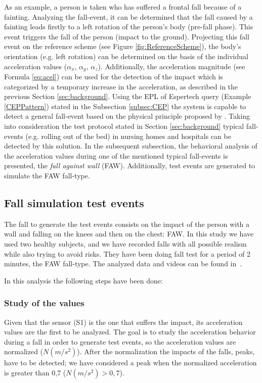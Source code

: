 \documentclass[review]{elsarticle}
\begin{document}
As an example, a person is taken who has suffered a frontal fall because of a fainting. Analyzing the fall-event, it can be determined that the fall caused by a fainting leads firstly to a left rotation of the person's body (pre-fall phase). This event triggers the fall of the person (impact to the ground). Projecting this fall event on the reference scheme (see Figure \ref{fig:ReferenceScheme}), the body's orientation (e.g. left rotation) can be determined on the basis of the individual acceleration values ($\alpha_x$,  $\alpha_y$,  $\alpha_z$). Additionally, the acceleration magnitude (see Formula \ref{eq:acel}) can be used for the detection of the impact which is categorized by a temporary increase in the acceleration, as described in the previous Section \ref{sec:background}. Using the EPL of Espertech query (Example \ref{CEPPattern}) stated in the Subsection \ref{subsec:CEP} the system is capable to detect a general fall-event based on the physical principle proposed by \cite{Kozina}.
Taking into consideration the test protocol stated in Section \ref{sec:background} typical fall-events (e.g. rolling out of the bed) in nursing homes and hospitals can be detected by this solution. In the subsequent subsection, the behavioral analysis of the acceleration values during one of the mentioned typical fall-events is presented, the \textit{fall against wall} (FAW). Additionally, test events are generated to simulate the FAW fall-type.

\subsection{Fall simulation test events}

The fall to generate the test events consists on the impact of the person with 
a wall and falling on the knees and then on the chest: FAW. 
In this study we have used two healthy subjects, and we have recorded falls with all 
possible realism while also trying to avoid risks. They have been doing fall test for a period 
of 2 minutes, the FAW fall-type. The analyzed data and videos can be found in~\cite{FallRepo}.

In this analysis the following steps have been done:

\subsubsection*{Study of the values} Given that the sensor (S1) is the one that suffers the 
impact, its acceleration values are the first to be analyzed. The goal is to study 
the acceleration behavior during a fall in order to generate test events, so the acceleration 
values are normalized ($N(m/s^2)$). After the normalization the impacts of the falls, peaks, 
have to be detected; we have considered a peak when the normalized acceleration is 
greater than 0,7 ($N(m/s^2) > 0,7$). 
\end{document}
